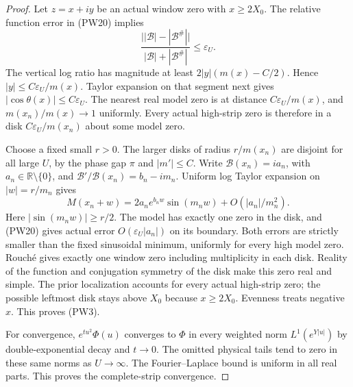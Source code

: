 \documentclass[11pt]{article}
\theoremstyle{remark}\newtheorem{remark}[theorem]{Remark}
\newcommand{\R}{\mathbb R}
\begin{document}
\begin{proof}
Let $z=x+iy$ be an actual window zero with $x\ge2X_0$.
The relative function error in (PW20) implies
\[
 \frac{\big||\mathcal B|-|\mathcal B^\#|\big|}
      {|\mathcal B|+|\mathcal B^\#|}\le\varepsilon_U.
\]
The vertical log ratio has magnitude at least
$2|y|(m(x)-C/2)$. Hence $|y|\le C\varepsilon_U/m(x)$.
Taylor expansion on that segment next gives
$|\cos\theta(x)|\le C\varepsilon_U$.
The nearest real model zero is at distance
$C\varepsilon_U/m(x)$, and $m(x_n)/m(x)\to1$ uniformly.
Every actual high-strip zero is therefore in a disk
$C\varepsilon_U/m(x_n)$ about some model zero.

Choose a fixed small $r>0$. The larger disks of radius $r/m(x_n)$
are disjoint for all large $U$, by the phase gap $\pi$ and $|m'|\le C$.
Write $\mathcal B(x_n)=ia_n$, with $a_n\in\R\setminus\{0\}$,
and $\mathcal B'/\mathcal B(x_n)=b_n-im_n$. Uniform log Taylor
expansion on $|w|=r/m_n$ gives
\[
 M(x_n+w)=2a_ne^{b_nw}\sin(m_nw)+O(|a_n|/m_n^2).   \tag{PW21}
\]
Here $|\sin(m_nw)|\ge r/2$. The model has exactly one zero in
the disk, and (PW20) gives actual error $O(\varepsilon_U|a_n|)$
on its boundary. Both errors are strictly smaller than the fixed
sinusoidal minimum, uniformly for every high model zero.
Rouch\'e gives exactly one window zero including multiplicity
in each disk. Reality of the function and conjugation symmetry
of the disk make this zero real and simple.
The prior localization accounts for every actual high-strip zero;
the possible leftmost disk stays above $X_0$ because $x\ge2X_0$.
Evenness treats negative $x$. This proves (PW3).

For convergence, $e^{tu^2}\Phi(u)$ converges to $\Phi$ in every
weighted norm $L^1(e^{Y|u|})$ by double-exponential decay and
$t\to0$. The omitted physical tails tend to zero in these same
norms as $U\to\infty$. The Fourier--Laplace bound is uniform in
all real parts. This proves the complete-strip convergence.
\end{proof}
\end{document}
